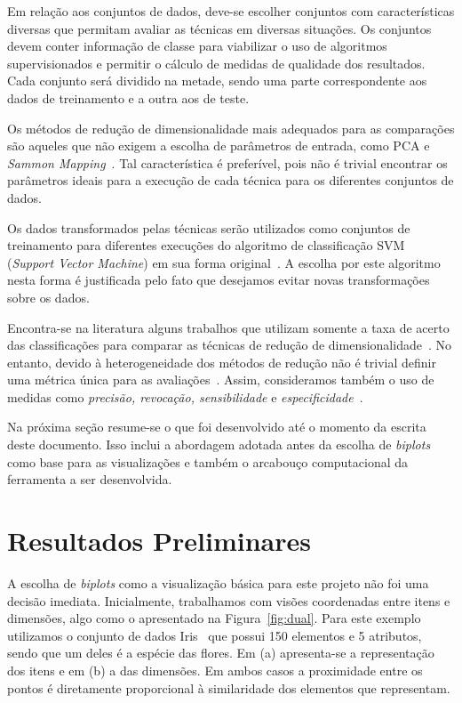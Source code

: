 Em relação aos conjuntos de dados, deve-se escolher
conjuntos com características diversas que permitam avaliar as
técnicas em diversas situações. Os conjuntos devem conter
informação de classe para viabilizar o uso de algoritmos
supervisionados e permitir o cálculo de medidas de qualidade
dos resultados. Cada conjunto será dividido na metade, sendo
uma parte correspondente aos dados de treinamento e a outra
aos de teste.

Os métodos de redução de dimensionalidade mais adequados
para as comparações são aqueles que não exigem a escolha de
parâmetros de entrada, como PCA e \emph{Sammon
Mapping}~\cite{Sammon1969}. Tal característica é preferível,
pois não é trivial encontrar os parâmetros ideais para a
execução de cada técnica para os diferentes conjuntos de
dados.

Os dados transformados pelas técnicas serão utilizados como
conjuntos de treinamento para diferentes execuções do
algoritmo de classificação SVM (\emph{Support Vector
Machine}) em sua forma original~\cite{Cortes1995}. A escolha
por este algoritmo nesta forma é justificada pelo fato que
desejamos evitar novas transformações sobre os dados.  

Encontra-se na literatura alguns trabalhos que utilizam somente a
taxa de acerto das classificações para comparar as técnicas
de redução de dimensionalidade~\cite{Guyon2003,Joshi2007}.
No entanto, devido à heterogeneidade dos métodos de redução
não é trivial definir uma métrica única para as
avaliações~\cite{Medeiros2011}. Assim, consideramos também o
uso de medidas como \emph{precisão, revocação,
sensibilidade} e \emph{especificidade}~\cite{Mitchell1997}.

Na próxima seção resume-se o que foi desenvolvido
até o momento da escrita deste documento. Isso inclui a
abordagem adotada antes da escolha de \emph{biplots} como base para
as visualizações e também o arcabouço computacional da
ferramenta a ser desenvolvida.

\section{Resultados Preliminares}

A escolha de \emph{biplots} como a visualização básica para
este projeto não foi uma decisão imediata. Inicialmente,
trabalhamos com visões coordenadas entre itens e dimensões,
algo como o apresentado na Figura~\ref{fig:dual}.  Para este
exemplo utilizamos o conjunto de dados
Iris~\cite{Fisher1936} que possui 150 elementos e 5
atributos, sendo que um deles é a espécie das flores. Em (a)
apresenta-se a representação dos itens e em (b) a das
dimensões. Em ambos casos a proximidade entre os pontos é
diretamente proporcional à similaridade dos elementos que
representam.

